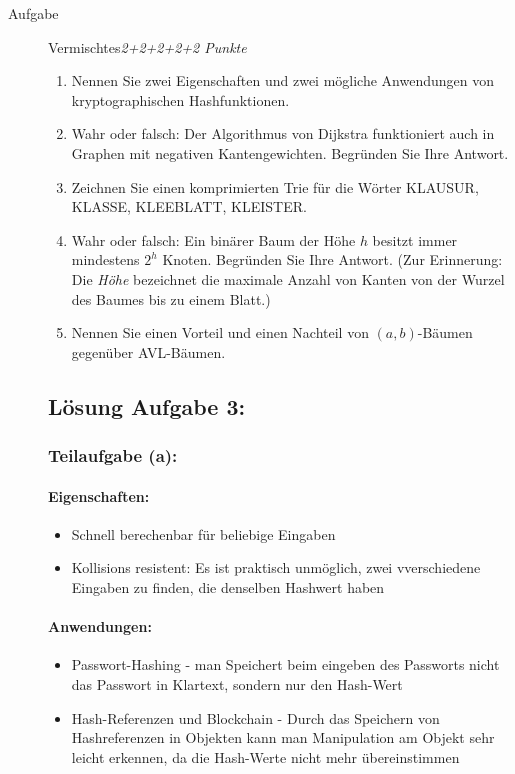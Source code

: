 \documentclass[a4paper,twoside,12pt]{article}
\newcounter{AUFGNR}
\newcommand{\AUFGABE}[2]{\vspace{0.3cm}\item[Aufgabe \arabic{AUFGNR}]\stepcounter{AUFGNR} #1\hfill\emph{#2}}
\begin{document}
\begin{description}
\newpage
\AUFGABE{Vermischtes}{2+2+2+2+2 Punkte}

\begin{enumerate}
  \item  
     Nennen Sie zwei Eigenschaften und zwei mögliche  Anwendungen von kryptographischen Hashfunktionen.
  \item Wahr oder falsch: Der Algorithmus von Dijkstra funktioniert auch in Graphen mit
	  negativen Kantengewichten. Begründen Sie Ihre Antwort.
  \item Zeichnen Sie einen komprimierten
    Trie für die Wörter KLAUSUR, KLASSE, KLEEBLATT, KLEISTER.
    \item
	    Wahr oder falsch: Ein binärer Baum der Höhe $h$ besitzt immer mindestens
		$2^h$ Knoten. Begründen Sie Ihre Antwort. (Zur Erinnerung: 
		Die \emph{Höhe} bezeichnet die maximale Anzahl von Kanten von der
		Wurzel des Baumes bis zu einem Blatt.)
	\item Nennen Sie einen Vorteil und einen Nachteil von $(a, b)$-Bäumen gegenüber
		AVL-Bäumen.
\end{enumerate}

\newpage
\subsection*{Lösung Aufgabe 3:}
\subsubsection*{Teilaufgabe (a):}
\paragraph{Eigenschaften:}
\begin{itemize}
	\item Schnell berechenbar für beliebige Eingaben
	\item Kollisions resistent: Es ist praktisch unmöglich, zwei vverschiedene Eingaben zu finden, die denselben Hashwert haben
\end{itemize}

\paragraph{Anwendungen:}
\begin{itemize}
	\item Passwort-Hashing - man Speichert beim eingeben des Passworts nicht das Passwort in Klartext, sondern nur den Hash-Wert
	\item Hash-Referenzen und Blockchain - Durch das Speichern von Hashreferenzen in Objekten kann man Manipulation am Objekt sehr leicht erkennen, da die Hash-Werte nicht mehr übereinstimmen
\end{itemize}


\end{description}
\end{document}

